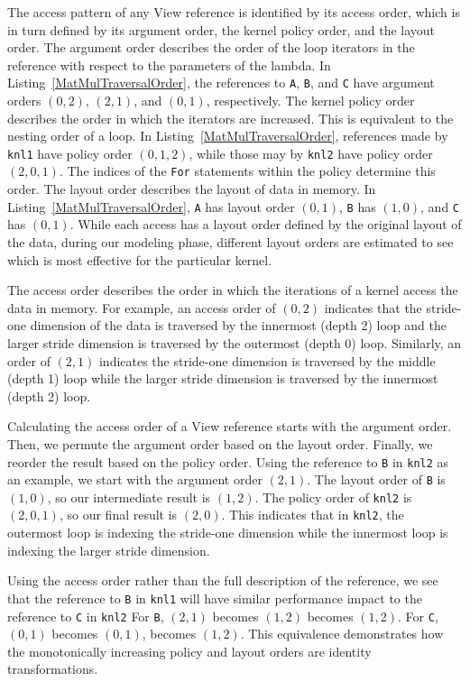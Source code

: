 \documentclass[sigconf,review=true]{acmart}
\begin{document}
The access pattern of any View reference is identified by its access order, which is in turn defined by its argument order, the kernel policy order, and the layout order. 
The argument order describes the order of the loop iterators in the reference with respect to the parameters of the lambda. 
In Listing~\ref{MatMulTraversalOrder}, the references to \verb.A., \verb.B., and \verb.C. have argument orders $(0,2)$, $(2,1)$, and $(0,1)$, respectively. 
The kernel policy order describes the order in which the iterators are increased. 
This is equivalent to the nesting order of a loop.
In Listing~\ref{MatMulTraversalOrder}, references made by \verb.knl1. have policy order $(0,1,2)$, while those may by \verb.knl2. have policy order $(2,0,1)$.
The indices of the \verb.For. statements within the policy determine this order.
The layout order describes the layout of data in memory. 
In Listing~\ref{MatMulTraversalOrder}, \verb.A. has layout order $(0,1)$, \verb.B. has $(1,0)$, and \verb.C. has $(0,1)$.
While each access has a layout order defined by the original layout of the data, during our modeling phase, different layout orders are estimated to see which is most effective for the particular kernel. 

The access order describes the order in which the iterations of a kernel access the data in memory.
For example, an access order of $(0,2)$ indicates that the stride-one dimension of the data is traversed by the innermost (depth 2) loop and the larger stride dimension is traversed by the outermost (depth 0) loop. 
Similarly, an order of $(2,1)$ indicates the stride-one dimension is traversed by the middle (depth 1) loop while the larger stride dimension is traversed by the innermost (depth 2) loop.

Calculating the access order of a View reference starts with the argument order.
Then, we permute the argument order based on the layout order. 
Finally, we reorder the result based on the policy order.
Using the reference to \verb.B. in \verb.knl2. as an example, we start with the argument order $(2,1)$.
The layout order of \verb.B. is $(1,0)$, so our intermediate result is $(1,2)$. 
The policy order of \verb.knl2. is $(2,0,1)$, so our final result is $(2,0)$. 
This indicates that in \verb.knl2., the outermost loop is indexing the stride-one dimension while the innermost loop is indexing the larger stride dimension.

Using the access order rather than the full description of the reference, we see that the reference to \verb.B. in \verb.knl1. will have similar performance impact to the reference to \verb.C. in \verb.knl2.
For \verb.B., $(2,1)$ becomes $(1,2)$ becomes $(1,2)$. 
For \verb.C., $(0,1)$ becomes $(0,1)$, becomes $(1,2)$.
This equivalence demonstrates how the monotonically increasing policy and layout orders are identity transformations.
\end{document}
